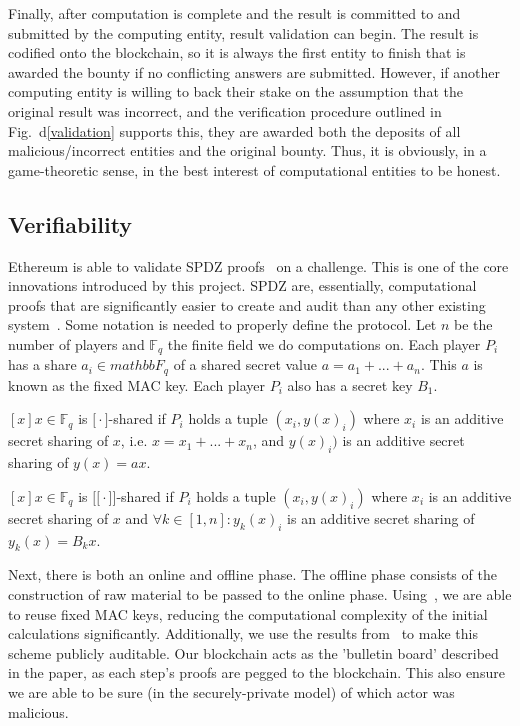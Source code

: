 \documentclass[journal]{IEEEtran}
\begin{document}
\par Finally, after computation is complete and the result is committed to and submitted by the computing entity, result validation can begin. The result is codified onto the blockchain, so it is always the first entity to finish that is awarded the bounty if no conflicting answers are submitted. However, if another computing entity is willing to back their stake on the assumption that the original result was incorrect, and the verification procedure outlined in Fig.~d\ref{validation} supports this, they are awarded both the deposits of all malicious/incorrect entities and the original bounty. Thus, it is obviously, in a game-theoretic sense, in the best interest of computational entities to be honest.

\subsection{Verifiability}

\par Ethereum is able to validate SPDZ proofs~\cite{Laud2014VerifiableMajority} on a challenge. This is one of the core innovations introduced by this project. SPDZ are, essentially, computational proofs that are significantly easier to create and audit than any other existing system~\cite{BaumEfficientAbort}. Some notation is needed to properly define the protocol. Let $n$ be the number of players and $\mathbb{F}_q$ the finite field we do computations on. Each player $P_i$ has a share $a_i \in mathbb{F}_q$ of a shared secret value $a = a_1 + ... + a_n$. This $a$ is known as the fixed MAC key. Each player $P_i$ also has a secret key $B_1$. 

\par $[x] x \in \mathbb{F}_q$ is $\big[{}\cdot{}\big]$-shared if $P_i$ holds a tuple $(x_i,y(x)_i)$ where $x_i$ is an additive secret sharing of $x$, i.e. $x = x_1 + ... + x_n$, and $y(x)_i)$ is an additive secret sharing of $y(x) = ax$.

\par $[x] x \in \mathbb{F}_q$ is $\big[{}\big[{}\cdot{}\big]{}\big]$-shared if $P_i$ holds a tuple $(x_i,y(x)_i)$ where $x_i$ is an additive secret sharing of $x$ and $\forall{}k \in [1,n]:y_k(x)_i$ is an additive secret sharing of $y_k(x) = B_kx$.

\par Next, there is both an online and offline phase. The offline phase consists of the construction of raw material to be passed to the online phase. Using~\cite{Lindell2015EfficientSPDZ}, we are able to  reuse fixed MAC keys, reducing the computational complexity of the initial calculations significantly. Additionally, we use the results from~\cite{BaumBetterComputation} to make this scheme publicly auditable. Our blockchain acts as the 'bulletin board' described in the paper, as each step's proofs are pegged to the blockchain. This also ensure we are able to be sure (in the securely-private model) of which actor was malicious. 
\end{document}
